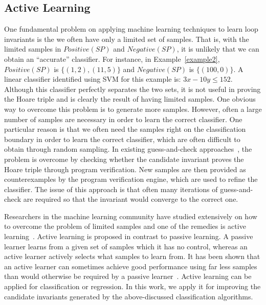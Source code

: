 \subsection{Active Learning} \label{active}
One fundamental problem on applying machine learning techniques to learn loop invariants is the we often have only a limited set of samples. That is, with the limited samples in $Positive(SP)$ and $Negative(SP)$, it is unlikely that we can obtain an ``accurate'' classifier. For instance, in Example~\ref{example2}, $Positive(SP)$ is $\{(1, 2),(11, 5)\}$ and $Negative(SP)$ is $\{(100, 0)\}$. A linear classifier identified using SVM for this example is: $3x-10y \leq 152$. Although this classifier perfectly separates the two sets, it is not useful in proving the Hoare triple and is clearly the result of having limited samples.
One obvious way to overcome this problem is to generate more samples. However, often a large number of samples are necessary in order to learn the correct classifier. One particular reason is that we often need the samples right on the classification boundary in order to learn the correct classifier, which are often difficult to obtain through random sampling. In existing guess-and-check approaches~\cite{sharma2012interpolants,sharma2013verification,DBLP:conf/esop/0001GHALN13,sharma2014invariant}, the problem is overcome by checking whether the candidate invariant proves the Hoare triple through program verification. New samples are then provided as counterexamples by the program verification engine, which are used to refine the classifier. The issue of this approach is that often many iterations of guess-and-check are required so that the invariant would converge to the correct one.

Researchers in the machine learning community have studied extensively on how to overcome the problem of limited samples and one of the remedies is active learning~\cite{DBLP:series/synthesis/2012Settles}.
Active learning is proposed in contrast to passive learning. A passive learner learns from a given set of samples which it has no control, whereas an active learner actively selects what samples to learn from. It has been shown that an active learner can sometimes achieve good performance using far less samples than would otherwise be required by a passive learner~\cite{DBLP:conf/mm/TongC01,DBLP:journals/jmlr/TongK01}. Active learning can be applied for classification or regression. In this work, we apply it for improving the candidate invariants generated by the above-discussed classification algorithms.

